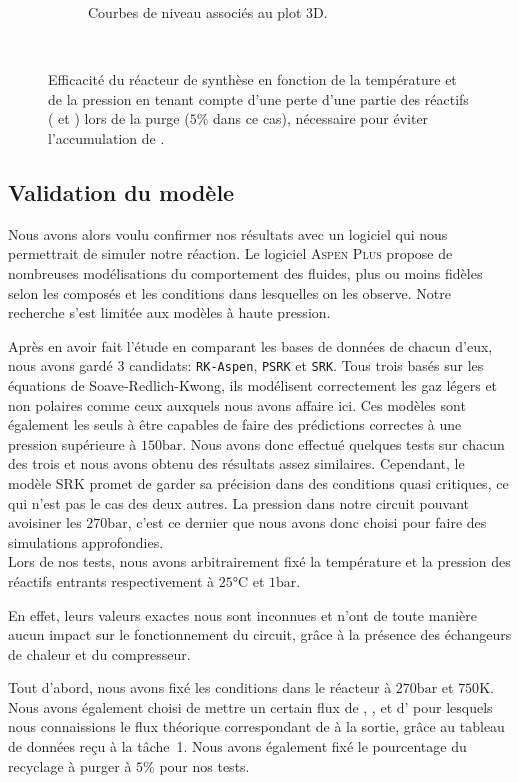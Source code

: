 \begin{figure}
\begin{subfigure}[b]{0.8\textwidth}
		\caption{Courbes de niveau associés au plot 3D.}
		\label{fig:efficienceC}
	\end{subfigure} \\
	\caption{Efficacité du réacteur de synthèse en fonction de la température 
		et de la pression en tenant compte d'une perte d'une partie des 
		réactifs ( et ) lors de la purge ($5\%$ dans ce cas),
		nécessaire pour éviter l'accumulation de .}
\end{figure}

\subsection{Validation du modèle}

Nous avons alors voulu confirmer nos résultats avec un logiciel 
qui nous permettrait de simuler notre réaction. 
Le logiciel \textsc{Aspen Plus} propose de nombreuses 
modélisations du comportement des fluides, 
plus ou moins fidèles selon les composés et 
les conditions dans lesquelles on les observe. 
Notre recherche s'est limitée aux modèles à haute pression. 

Après en avoir fait l'étude en comparant les bases de données de chacun d'eux, 
nous avons gardé 3 candidats: \texttt{RK-Aspen}, \texttt{PSRK} et \texttt{SRK}. 
Tous trois basés sur les équations de Soave-Redlich-Kwong, 
ils modélisent correctement les gaz légers et non polaires 
comme ceux auxquels nous avons affaire ici. 
Ces modèles sont également les seuls à être capables de faire 
des prédictions correctes à une pression supérieure à $150\si{\bar}$. 
Nous avons donc effectué quelques tests sur chacun des trois 
et nous avons obtenu des résultats assez similaires.
Cependant, le modèle SRK promet de garder sa précision dans des conditions 
quasi critiques, ce qui n'est pas le cas des deux autres. 
La pression dans notre circuit pouvant avoisiner les $270\si{\bar}$, 
c'est ce dernier que nous avons donc choisi pour faire des simulations approfondies.\\
Lors de nos tests, nous avons arbitrairement fixé la température et 
la pression des réactifs entrants respectivement à $25\si{\degreeCelsius}$ et $1\si{\bar}$.

En effet, leurs valeurs exactes nous sont inconnues et n'ont de toute manière 
aucun impact sur le fonctionnement du circuit, grâce à la présence des échangeurs de chaleur 
et du compresseur.

Tout d'abord, nous avons fixé les conditions dans le réacteur à $270\si{\bar}$ 
et $750\si{\kelvin}$. 
Nous avons également choisi de mettre un certain flux de , , et d'  
pour lesquels nous connaissions le flux théorique correspondant de  à la sortie,
grâce au tableau de données reçu à la tâche~1. 
Nous avons également fixé le pourcentage du recyclage à purger à $5\%$ pour nos tests.\\

